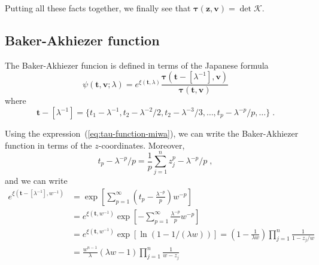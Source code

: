 \documentclass[a4paper,11pt]{amsart}
\begin{document}
Putting all these facts together, we finally see that 
\(\bm{\tau}(\bm{z}, \bm{v}) = \det\bm{\mathcal{K}}\). 


\subsection{Baker-Akhiezer function}

The Baker-Akhiezer funcion is defined in terms of the Japanese formula~\cite{Zabrodin2018}
\begin{equation}
  \psi(\bm{t},\bm{v}; \lambda) = e^{\xi(\bm{t}, \lambda)}
  \frac{\bm{\tau}(\bm{t} - [\lambda^{-1}], \bm{v})}{\bm{\tau}(\bm{t}, \bm{v})}
\end{equation}
where 
\begin{equation}
  \bm{t} - [\lambda^{-1}] = 
  \{t_1 - \lambda^{-1}, t_2 - \lambda^{-2}/ 2 ,  t_2 - \lambda^{-3}/3, \dots,  t_p - \lambda^{-p}/p, \dots \}\; .
\end{equation}

Using the expression~(\ref{eq:tau-function-miwa}), we can write the
Baker-Akhiezer function in terms of the \(z\)-coordinates.
Moreover, 
\begin{equation}
  t_p - \lambda^{-p}/p = \frac{1}{p} \sum_{j=1}^n z_j^ p - \lambda^{-p}/p \; , 
\end{equation}
and we can write
\begin{equation}
  \begin{split}
    e^{\xi(\bm{t} - [\lambda^{-1}], w^{-1})} & = \exp\left[ \sum_{p=1}^\infty \left(t_p  - \frac{\lambda^{-p}}{p}\right) w^{-p} \right]\\
    & = e^{\xi(\bm{t}, w^{-1})} \exp\left[ - \sum_{p=1}^\infty \frac{\lambda^{-p}}{p} w^{-p} \right] \\
    & = e^{\xi(\bm{t}, w^{-1})} \exp\left[ \ln ( 1 - 1 / (\lambda w)) \right]
      = \left( 1 - \frac{1}{\lambda w}\right)  \prod_{j=1}^n \frac{1}{1 -  z_j /w} \\
    & = \frac{w^{n-1}}{\lambda } \left( \lambda w - 1 \right)  \prod_{j=1}^n \frac{1}{w -  z_j} \\
  \end{split}
\end{equation}
\end{document}
